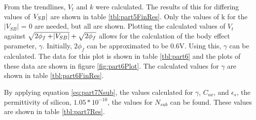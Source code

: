 
From the trendlines, $V_t$ and $k$ were calculated. The results of this for differing values of $\abs{V_{SB}}$ are shown in table \ref{tbl:part5FinRes}. Only the values of k for the $|V_{SB}|$ = 0 are needed, but all are shown. 
Plotting the calculated values of $V_t$ against $\sqrt{2\phi_f+\abs{V_{SB}}}+\sqrt{2\phi_f}$ allows for the calculation of the body effect parameter, $\gamma$. Initially, $2\phi_f$ can be approximated to be 0.6V. Using this, $\gamma$ can be calculated. The data for this plot is shown in table \ref{tbl:part6} and the plots of these data are shown in figure \ref{fig:part6Plot}. 
The calculated values for $\gamma$ are shown in table \ref{tbl:part6FinRes}. 


By applying equation \ref{eq:part7Nsub}, the values calculated for $\gamma$, $C_{ox}$, and $\epsilon_s$, the permittivity of silicon, $1.05*10^{-10}$, the values for $N_{sub}$ can be found. These values are shown in table \ref{tbl:part7Res}. 

